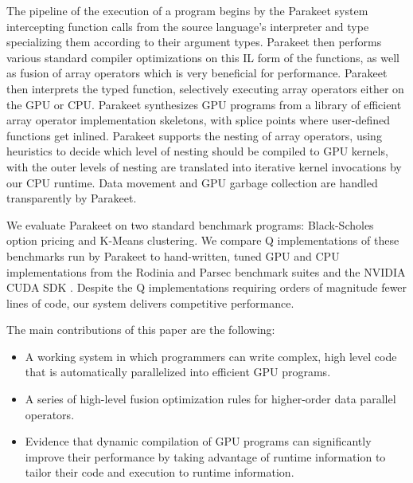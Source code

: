 \documentclass[preprint]{sigplanconf}
\begin{document}
The pipeline of the execution of a program begins by the Parakeet system
intercepting function calls from the source language's interpreter and type
specializing them according to their argument types.  Parakeet then performs
various standard compiler optimizations on this IL form of the functions, as
well as fusion of array operators which is very beneficial for performance.
Parakeet then interprets the typed function, selectively executing array
operators either on the GPU or CPU. Parakeet synthesizes GPU
programs from a library of efficient array operator implementation skeletons,
with splice points where user-defined functions get inlined. Parakeet supports
the nesting of array operators, using heuristics to decide which level of
nesting should be compiled to GPU kernels, with the outer levels of nesting are
translated into iterative kernel invocations by our CPU runtime.  Data movement
and GPU garbage collection are handled transparently by Parakeet.

We evaluate Parakeet on two standard benchmark programs: Black-Scholes option
pricing and K-Means clustering.  We compare Q implementations of these
benchmarks run by Parakeet to hand-written, tuned GPU and CPU implementations
from the Rodinia \cite{Che09} and Parsec \cite{Bien08} benchmark suites and the
NVIDIA CUDA SDK \cite{NvidSD}.  Despite the Q implementations requiring orders
of magnitude fewer lines of code, our system delivers competitive performance.

The main contributions of this paper are the following:

\begin{itemize}
\item A working system in which programmers can write complex, high level code
that is automatically parallelized into efficient GPU programs.
\item A series of high-level fusion optimization rules for higher-order data
parallel operators.
\item Evidence that dynamic compilation of GPU programs can significantly
improve their performance by taking advantage of runtime information to
tailor their code and execution to runtime information.
\end{itemize}
\end{document}
